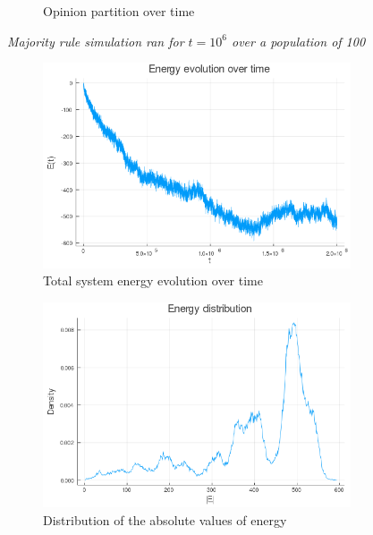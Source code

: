 \documentclass[12pt,openright,twoside]{book}
\begin{document}
\begin{appendices}
\begin{figure}[!htb]
\begin{subfigure}[b]{0.65\linewidth}
    \caption{Opinion partition over time}
\end{subfigure}
\caption{\textit{{\small Majority rule simulation ran for $t=10^6$ over a population of 100}}}
\label{2_1}
\end{figure}

\begin{figure}[!htb]
\centering
\begin{subfigure}[b]{0.65\linewidth}
    \includegraphics[width=\linewidth]{figures/2_2_er/energy_evolution.png}
    \caption{Total system energy evolution over time}
\end{subfigure}
\begin{subfigure}[b]{0.65\linewidth}
    \includegraphics[width=\linewidth]{figures/2_2_er/energy_distribution.png}
    \caption{Distribution of the absolute values of energy}
\end{subfigure}
\begin{subfigure}[b]{0.65\linewidth}

\end{subfigure}
\end{figure}
\end{appendices}
\end{document}
